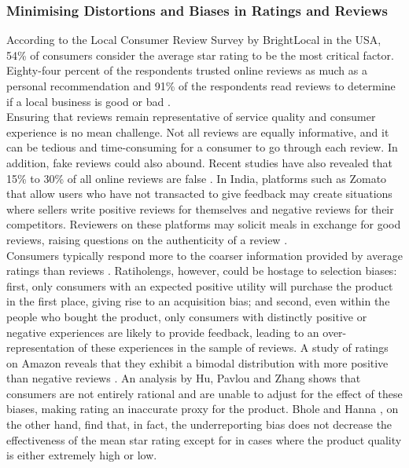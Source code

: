 \documentclass[a4paper, 12pt]{article}
\begin{document}
                    
                    \subsubsection{Minimising Distortions and Biases in Ratings and Reviews}
                    
                    According to the Local Consumer Review Survey by BrightLocal in the USA, 54\% of consumers consider the average star rating to be the most critical factor. Eighty-four percent of the respondents trusted online reviews as much as a personal recommendation and 91\% of the respondents read reviews to determine if a local business is good or bad \parencite{BrightLocal17}. \\ 

Ensuring that reviews remain representative of service quality and consumer experience is no mean challenge. Not all reviews are equally informative, and it can be tedious and time-consuming for a consumer to go through each review. In addition, fake reviews could also abound. Recent studies have also revealed that 15\% to 30\% of all online reviews are false \parencite{ivanova2017can}. In India, platforms such as Zomato that allow users who have not transacted to give feedback may create situations where sellers write positive reviews for themselves and negative reviews for their competitors. Reviewers on these platforms may solicit meals in exchange for good reviews, raising questions on the authenticity of a review \parencite{ChaddahP}.\\

Consumers typically respond more to the coarser information provided by average ratings than reviews \parencite{dai2012optimal}. Ratiholengs, however, could be hostage to selection biases: first, only consumers with an expected positive utility will purchase the product in the first place, giving rise to an acquisition bias; and second, even within the people who bought the product, only consumers with distinctly positive or negative experiences are likely to provide feedback, leading to an over-representation of these experiences in the sample of reviews. A study of ratings on Amazon reveals that they exhibit a bimodal distribution with more positive than negative reviews \parencite{luca2016fake}. An analysis by Hu, Pavlou and Zhang \parencite{hu2017self}  shows that consumers are not entirely rational and are unable to adjust for the effect of these biases, making rating an inaccurate proxy for the product. Bhole and Hanna \parencite{bhole2017effectiveness}, on the other hand, find that, in fact, the underreporting bias does not decrease the effectiveness of the mean star rating except for in cases where the product quality is either extremely high or low.\\
\end{document}
